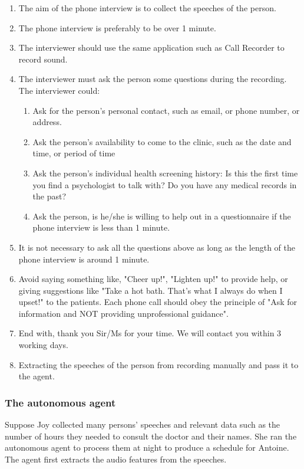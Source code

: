 \documentclass{article}
\begin{document}
    \begin{enumerate}
    		\item The aim of the phone interview is to collect the speeches of the person.
    		\item The phone interview is preferably to be over 1 minute.
		\item The interviewer should use the same application such as Call Recorder to record sound.
		\item The interviewer must ask the person some questions during the recording. The interviewer could: 
          \begin{enumerate}
          	\item Ask for the person's personal contact, such as email, or phone number, or address.
          	\item Ask the person's availability to come to the clinic, such as the date and time, or period of time
          	\item Ask the person's individual health screening history: 
          	Is this the first time you find a psychologist to talk with? Do you have any medical records in the past?
          	\item Ask the person, is he/she is willing to help out in a questionnaire if the phone interview is less than 1 minute.
          \end{enumerate}
        \item It is not necessary to ask all the questions above as long as the length of the phone interview is around 1 minute.
        \item Avoid saying something like, "Cheer up!", "Lighten up!" to provide help, or giving suggestions like 
        		"Take a hot bath. That's what I always do when I upset!" to the patients. 
        		Each phone call should obey the principle of "Ask for information and NOT providing unprofessional guidance". \cite{PsychCentral2015}
        \item End with, thank you Sir/Ms for your time. We will contact you within 3 working days.
        \item Extracting the speeches of the person from recording manually and pass it to the agent.
	\end{enumerate}


	\subsubsection{The autonomous agent}
	Suppose Joy collected many persons' speeches and relevant data such as the number of hours they needed to consult the doctor and their names. 
	She ran the autonomous agent to process them at night to produce a schedule for Antoine.
	The agent first extracts the audio features from the speeches.
\end{document}
